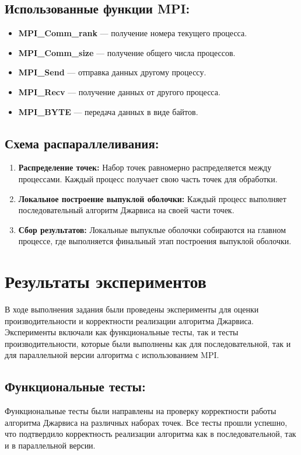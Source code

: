 \documentclass[12pt]{article}
\begin{document}
\subsection*{Использованные функции MPI:}
\begin{itemize}
    \item \textbf{MPI\_Comm\_rank} — получение номера текущего процесса.
    \item \textbf{MPI\_Comm\_size} — получение общего числа процессов.
    \item \textbf{MPI\_Send} — отправка данных другому процессу.
    \item \textbf{MPI\_Recv} — получение данных от другого процесса.
    \item \textbf{MPI\_BYTE} — передача данных в виде байтов.
\end{itemize}

\subsection*{Схема распараллеливания:}
\begin{enumerate}
    \item \textbf{Распределение точек:} Набор точек равномерно распределяется между процессами. Каждый процесс получает свою часть точек для обработки.
    \item \textbf{Локальное построение выпуклой оболочки:} Каждый процесс выполняет последовательный алгоритм Джарвиса на своей части точек.
    \item \textbf{Сбор результатов:} Локальные выпуклые оболочки собираются на главном процессе, где выполняется финальный этап построения выпуклой оболочки.
\end{enumerate}

\section*{Результаты экспериментов}
В ходе выполнения задания были проведены эксперименты для оценки производительности и корректности реализации алгоритма Джарвиса. Эксперименты включали как функциональные тесты, так и тесты производительности, которые были выполнены как для последовательной, так и для параллельной версии алгоритма с использованием MPI.

\subsection*{Функциональные тесты:}
Функциональные тесты были направлены на проверку корректности работы алгоритма Джарвиса на различных наборах точек. Все тесты прошли успешно, что подтвердило корректность реализации алгоритма как в последовательной, так и в параллельной версии.
\end{document}
